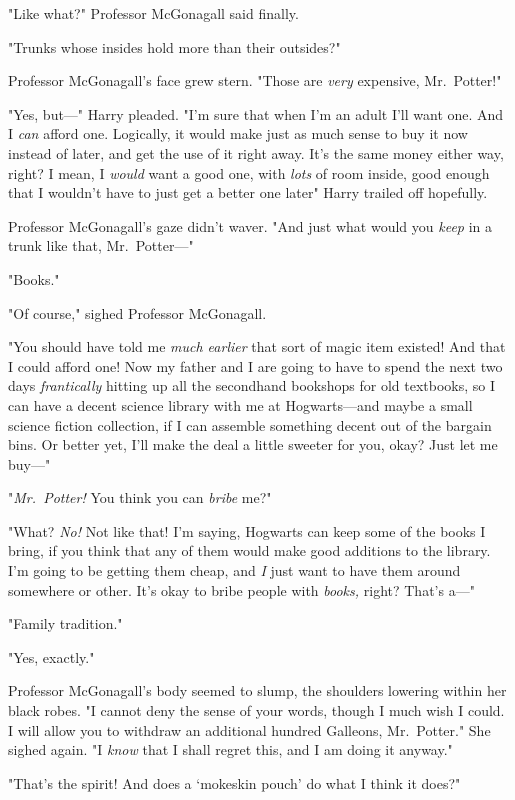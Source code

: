 "Like what?" Professor McGonagall said finally.

"Trunks whose insides hold more than their outsides?"

Professor McGonagall's face grew stern. "Those are \emph{very} expensive,
Mr.~Potter!"

"Yes, but—" Harry pleaded. "I'm sure that when I'm an adult I'll want one.
And I \emph{can} afford one. Logically, it would make just as much sense to buy
it now instead of later, and get the use of it right away. It's the same money
either way, right? I mean, I \emph{would} want a good one, with \emph{lots} of
room inside, good enough that I wouldn't have to just get a better one
later{\el}" Harry trailed off hopefully.

Professor McGonagall's gaze didn't waver. "And just what would you \emph{keep}
in a trunk like that, Mr.~Potter—"

"Books."

"Of course," sighed Professor McGonagall.

"You should have told me \emph{much earlier} that sort of magic item existed!
And that I could afford one! Now my father and I are going to have to spend the
next two days \emph{frantically} hitting up all the secondhand bookshops for
old textbooks, so I can have a decent science library with me at Hogwarts—and
maybe a small science fiction collection, if I can assemble something decent
out of the bargain bins. Or better yet, I'll make the deal a little sweeter for
you, okay? Just let me buy—"

"\emph{Mr.~Potter!} You think you can \emph{bribe} me?"

"What? \emph{No!} Not like that! I'm saying, Hogwarts can keep some of the
books I bring, if you think that any of them would make good additions to the
library. I'm going to be getting them cheap, and \emph{I} just want to have
them around somewhere or other. It's okay to bribe people with \emph{books,}
right? That's a—"

"Family tradition."

"Yes, exactly."

Professor McGonagall's body seemed to slump, the shoulders lowering within her
black robes. "I cannot deny the sense of your words, though I much wish I
could. I will allow you to withdraw an additional hundred Galleons,
Mr.~Potter." She sighed again. "I \emph{know} that I shall regret this, and I
am doing it anyway."

"That's the spirit! And does a `mokeskin pouch' do what I think it does?"

